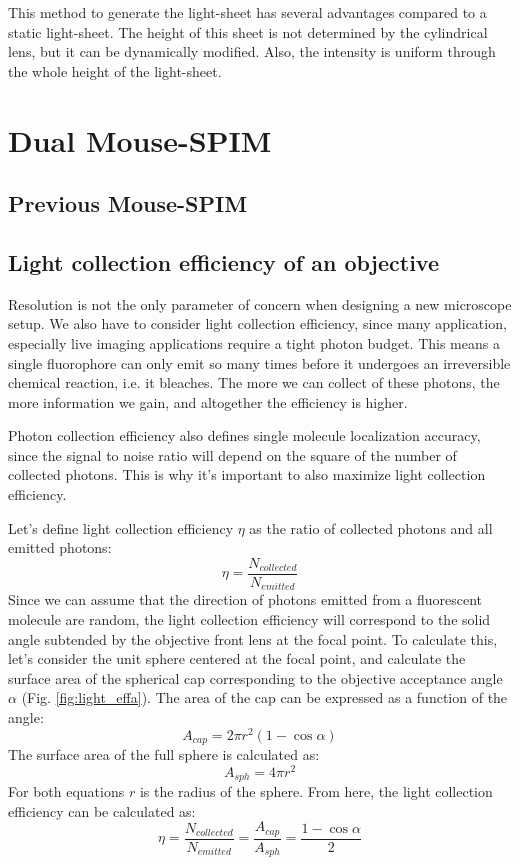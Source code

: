 \documentclass{diploma_style}
\begin{document}
This method to generate the light-sheet has several advantages compared to a static light-sheet. The height of this sheet is not determined by the cylindrical lens, but it can be dynamically modified. Also, the intensity is uniform through the whole height of the light-sheet.
		
		
\chapter{Dual Mouse-SPIM}
	\section{Previous Mouse-SPIM}
	\section{Light collection efficiency of an objective}
	Resolution is not the only parameter of concern when designing a new microscope setup. We also have to consider light collection efficiency, since many application, especially live imaging applications require a tight photon budget. This means a single fluorophore can only emit so many times before it undergoes an irreversible chemical reaction, i.e. it bleaches. The more we can collect of these photons, the more information we gain, and altogether the efficiency is higher.
	
	Photon collection efficiency also defines single molecule localization accuracy, since the signal to noise ratio will depend on the square of the number of collected photons. This is why it's important to also maximize light collection efficiency.
	
	Let's define light collection efficiency $\eta$ as the ratio of collected photons and all emitted photons:
	\[
	\eta = \frac{N_{collected}}{N_{emitted}}
	\]
	Since we can assume that the direction of photons emitted from a fluorescent molecule are random, the light collection efficiency will correspond to the solid angle subtended by the objective front lens at the focal point. To calculate this, let's consider the unit sphere centered at the focal point, and calculate the surface area of the spherical cap corresponding to the objective acceptance angle $\alpha$ (Fig. \ref{fig:light_effa}). The area of the cap can be expressed as a function of the angle:
	\[
	A_{cap} = 2\pi r^2 (1-\cos \alpha)
	\]
	The surface area of the full sphere is calculated as:
	\[
	A_{sph} = 4 \pi r^2
	\]
	For both equations $r$ is the radius of the sphere. From here, the light collection efficiency can be calculated as:
	\[
	\eta = \frac{N_{collected}}{N_{emitted}} = \frac{A_{cap}}{A_{sph}} = \frac{1-\cos \alpha}{2}
	\]
\end{document}
